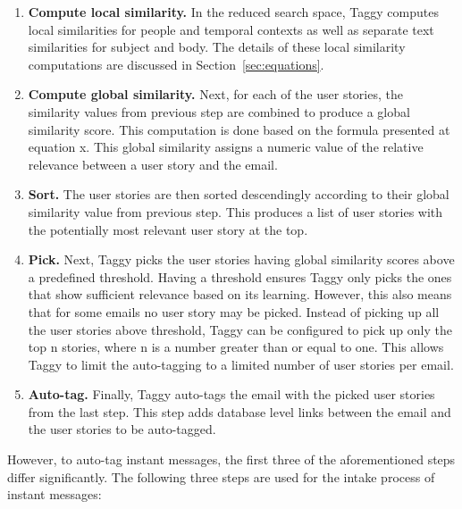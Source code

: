 \begin{enumerate}
	\item \textbf{Compute local similarity.} In the reduced search space, Taggy computes local similarities for people and temporal contexts as well as separate text similarities for subject and body. The details of these local similarity computations are discussed in Section~\ref{sec:equations}.
	
	\item \textbf{Compute global similarity.} Next, for each of the user stories, the similarity values from previous step are combined to produce a global similarity score. This computation is done based on the formula presented at equation x. This global similarity assigns a numeric value of the relative relevance between a user story and the email.
	
	\item \textbf{Sort.} The user stories are then sorted descendingly according to their global similarity value from previous step. This produces a list of user stories with the potentially most relevant user story at the top.
	
	\item \textbf{Pick.} Next, Taggy picks the user stories having global similarity scores above a predefined threshold. Having a threshold ensures Taggy only picks the ones that show sufficient relevance based on its learning. However, this also means that for some emails no user story may be picked. Instead of picking up all the user stories above threshold, Taggy can be configured to pick up only the top n stories, where n is a number greater than or equal to one. This allows Taggy to limit the auto-tagging to a limited number of user stories per email.
	
	\item \textbf{Auto-tag.}	Finally, Taggy auto-tags the email with the picked user stories from the last step. This step adds database level links between the email and the user stories to be auto-tagged.
\end{enumerate}

However, to auto-tag instant messages, the first three of the aforementioned steps differ significantly. The following three steps are used for the intake process of instant messages:

